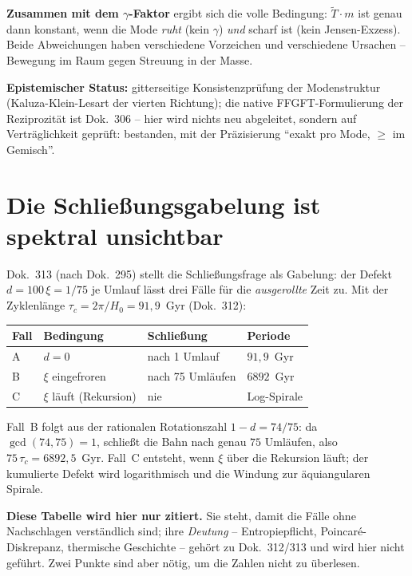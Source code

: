 \documentclass[11pt]{report}
\begin{document}
\textbf{Zusammen mit dem $\gamma$-Faktor} ergibt sich die volle
Bedingung: $\tilde T\cdot m$ ist genau dann konstant, wenn die
Mode \emph{ruht} (kein $\gamma$) \emph{und} scharf ist (kein
Jensen-Exzess). Beide Abweichungen haben verschiedene Vorzeichen
und verschiedene Ursachen -- Bewegung im Raum gegen Streuung in
der Masse.

\textbf{Epistemischer Status:} gitterseitige Konsistenzprüfung der
Modenstruktur (Kaluza-Klein-Lesart der vierten Richtung); die
native FFGFT-Formulierung der Reziprozität ist Dok.~306 -- hier
wird nichts neu abgeleitet, sondern auf Verträglichkeit geprüft:
bestanden, mit der Präzisierung \enquote{exakt pro Mode, $\ge$ im
Gemisch}.

\section{Die Schließungsgabelung ist spektral unsichtbar}

Dok.~313 (nach Dok.~295) stellt die Schließungsfrage als Gabelung:
der Defekt $d = 100\,\xi = 1/75$ je Umlauf lässt drei Fälle für die
\emph{ausgerollte} Zeit zu. Mit der Zyklenlänge
$\tau_c = 2\pi/H_0 = 91{,}9$~Gyr (Dok.~312):

\begin{center}
\begin{tabular}{llll}
\toprule
Fall & Bedingung & Schließung & Periode \\
\midrule
A & $d = 0$ & nach 1 Umlauf & $91{,}9$~Gyr \\
B & $\xi$ eingefroren & nach 75 Umläufen & $6892$~Gyr \\
C & $\xi$ läuft (Rekursion) & nie & Log-Spirale \\
\bottomrule
\end{tabular}
\end{center}

\noindent Fall~B folgt aus der rationalen Rotationszahl
$1-d = 74/75$: da $\gcd(74,75) = 1$, schließt die Bahn nach genau
$75$ Umläufen, also $75\,\tau_c = 6892{,}5$~Gyr. Fall~C entsteht,
wenn $\xi$ über die Rekursion läuft; der kumulierte Defekt wird
logarithmisch und die Windung zur äquiangularen Spirale.

\textbf{Diese Tabelle wird hier nur zitiert.} Sie steht, damit die
Fälle ohne Nachschlagen verständlich sind; ihre \emph{Deutung} --
Entropiepflicht, Poincaré-Diskrepanz, thermische Geschichte --
gehört zu Dok.~312/313 und wird hier nicht geführt. Zwei Punkte
sind aber nötig, um die Zahlen nicht zu überlesen.
\end{document}
